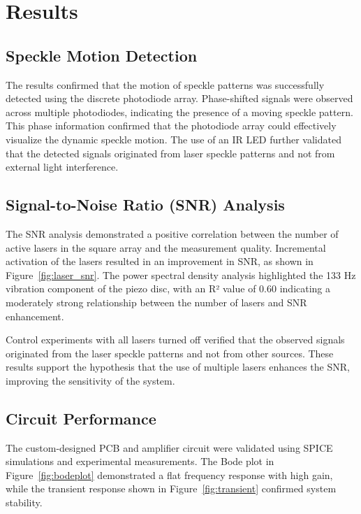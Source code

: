 \section{Results}
\label{sec:results}

\subsection{Speckle Motion Detection}

The results confirmed that the motion of speckle patterns was successfully detected using the discrete photodiode array. 
Phase-shifted signals were observed across multiple photodiodes, indicating the presence of a moving speckle pattern. 
This phase information confirmed that the photodiode array could effectively visualize the dynamic speckle motion. 
The use of an IR LED further validated that the detected signals originated from laser speckle patterns and not from external light interference.

\subsection{Signal-to-Noise Ratio (SNR) Analysis}

The SNR analysis demonstrated a positive correlation between the number of active lasers in the square array and the measurement quality. 
Incremental activation of the lasers resulted in an improvement in SNR, as shown in Figure~\ref{fig:laser_snr}. 
The power spectral density analysis highlighted the 133 Hz vibration component of the piezo disc, with an R² value of 0.60 indicating a moderately strong relationship between the number of lasers and SNR enhancement.

Control experiments with all lasers turned off verified that the observed signals originated from the laser speckle patterns and not from other sources. 
These results support the hypothesis that the use of multiple lasers enhances the SNR, improving the sensitivity of the system.

\subsection{Circuit Performance}

The custom-designed PCB and amplifier circuit were validated using SPICE simulations and experimental measurements. 
The Bode plot in Figure~\ref{fig:bodeplot} demonstrated a flat frequency response with high gain, while the transient response shown in Figure~\ref{fig:transient} confirmed system stability. 

